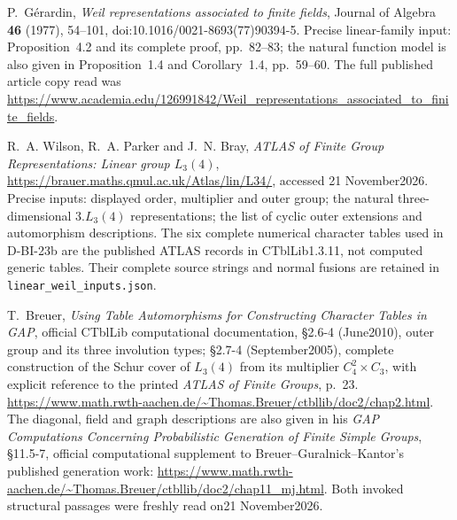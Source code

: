 P.~G\'erardin, \emph{Weil representations associated to finite fields},
Journal of Algebra \textbf{46} (1977), 54--101,
doi:10.1016/0021-8693(77)90394-5.
Precise linear-family input: Proposition~4.2 and its complete proof,
pp.~82--83; the natural function model is also given in Proposition~1.4
and Corollary~1.4, pp.~59--60. The full published article copy read
was \url{https://www.academia.edu/126991842/Weil_representations_associated_to_finite_fields}.

R.~A. Wilson, R.~A. Parker and J.~N. Bray,
\emph{ATLAS of Finite Group Representations: Linear group $L_3(4)$},
\url{https://brauer.maths.qmul.ac.uk/Atlas/lin/L34/},
accessed 21 November2026.
Precise inputs: displayed order, multiplier and outer group;
the natural three-dimensional $3.L_3(4)$ representations;
the list of cyclic outer extensions and automorphism descriptions.
The six complete numerical character tables used in D-BI-23b
are the published ATLAS records in CTblLib1.3.11, not computed
generic tables. Their complete source strings and normal fusions
are retained in \texttt{linear\_weil\_inputs.json}.

T.~Breuer, \emph{Using Table Automorphisms for Constructing
Character Tables in GAP}, official CTblLib computational documentation,
\S2.6-4 (June2010), outer group and its three involution types;
\S2.7-4 (September2005), complete construction of the Schur cover
of $L_3(4)$ from its multiplier $C_4^2\times C_3$, with explicit
reference to the printed \emph{ATLAS of Finite Groups}, p.~23.
\url{https://www.math.rwth-aachen.de/~Thomas.Breuer/ctbllib/doc2/chap2.html}.
The diagonal, field and graph descriptions are also given in his
\emph{GAP Computations Concerning Probabilistic Generation of Finite
Simple Groups}, \S11.5-7, official computational supplement to
Breuer--Guralnick--Kantor's published generation work:
\url{https://www.math.rwth-aachen.de/~Thomas.Breuer/ctbllib/doc2/chap11_mj.html}.
Both invoked structural passages were freshly read on21 November2026.
